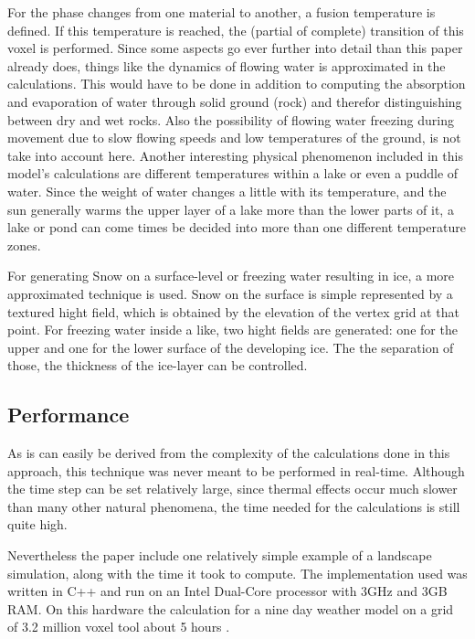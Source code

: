 For the phase changes from one material to another, a fusion temperature is defined. If this temperature is reached, the (partial of complete) transition of this voxel is performed. Since some aspects go ever further into detail than this paper already does, things like the dynamics of flowing water is approximated in the calculations. This would have to be done in addition to computing the absorption and evaporation of water through solid ground (rock) and therefor distinguishing between dry and wet rocks. Also the possibility of flowing water freezing during movement due to slow flowing speeds and low temperatures of the ground, is not take into account here. Another interesting physical phenomenon included in this model's calculations are different temperatures within a lake or even a puddle of water. Since the weight of water changes a little with its temperature, and the sun generally warms the upper layer of a lake more than the lower parts of it, a lake or pond can come times be decided into more than one different temperature zones.

For generating Snow on a surface-level or freezing water resulting in ice, a more approximated technique is used. Snow on the surface is simple represented by a textured hight field, which is obtained by the elevation of the vertex grid at that point. For freezing water inside a like, two hight fields are generated: one for the upper and one for the lower surface of the developing ice. The the separation of those, the thickness of the ice-layer can be controlled.

\subsection{Performance}
As is can easily be derived from the complexity of the calculations done in this approach, this technique was never meant to be performed in real-time. Although the time step can be set relatively large, since thermal effects occur much slower than many other natural phenomena, the time needed for the calculations is still quite high.

Nevertheless the paper include one relatively simple example of a landscape simulation, along with the time it took to compute. The implementation used was written in C++ and run on an Intel Dual-Core processor with 3GHz and 3GB RAM. On this hardware the calculation for a nine day weather model on a grid of 3.2 million voxel tool about 5 hours \cite{benes2001layered}.
